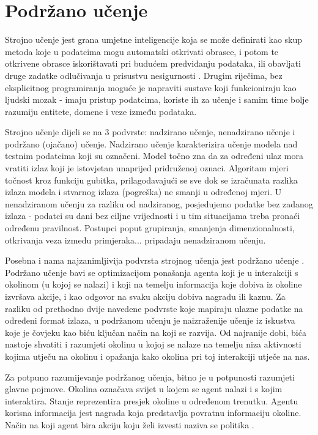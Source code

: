 \chapter{Podržano učenje}

Strojno učenje  jest grana umjetne inteligencije  koja se može definirati kao skup metoda koje u podatcima mogu automatski otkrivati obrasce, i potom te otkrivene obrasce iskorištavati pri budućem predviđanju podataka, ili obavljati druge zadatke odlučivanja u prisustvu nesigurnosti \cite{CupicUvod}. Drugim riječima, bez eksplicitnog programiranja moguće je napraviti sustave koji funkcioniraju kao ljudski mozak - imaju pristup podatcima, koriste ih za učenje i samim time bolje razumiju entitete, domene i veze između podataka. 

Strojno učenje dijeli se na 3 podvrste: nadzirano učenje, nenadzirano učenje i podržano (ojačano) učenje. Nadzirano učenje  karakterizira učenje modela nad testnim podatcima koji su označeni. Model točno zna da za određeni ulaz mora vratiti izlaz koji je istovjetan unaprijed pridruženoj oznaci. Algoritam mjeri točnost kroz funkciju gubitka, prilagođavajući se sve dok se izračunata razlika izlaza modela i stvarnog izlaza (pogreška) ne smanji u određenoj mjeri. U nenadziranom učenju  za razliku od nadziranog, posjedujemo podatke bez zadanog izlaza - podatci su dani bez ciljne vrijednosti i u tim situacijama treba pronaći određenu pravilnost. Postupci poput grupiranja, smanjenja dimenzionalnosti, otkrivanja veza između primjeraka... pripadaju nenadziranom učenju.

Posebna i nama najzanimljivija podvrsta strojnog učenja jest podržano učenje . Podržano učenje bavi se optimizacijom ponašanja agenta koji je u interakciji s okolinom (u kojoj se nalazi) i koji na temelju informacija koje dobiva iz okoline izvršava akcije, i kao odgovor na svaku akciju dobiva nagradu ili kaznu. Za razliku od prethodno dvije navedene podvrste koje mapiraju ulazne podatke na određeni format izlaza, u podržanom učenju je naizraženije učenje iz iskustva koje je čovjeku kao biću ključan način na koji se razvija. Od najranije dobi, bića nastoje shvatiti i razumjeti okolinu u kojoj se nalaze na temelju niza aktivnosti kojima utječu na okolinu i opažanja kako okolina pri toj interakciji utječe na nas. 

Za potpuno razumijevanje podržanog učenja, bitno je u potpunosti razumjeti glavne pojmove. Okolina  označava svijet u kojem se agent nalazi i s kojim interaktira. Stanje  reprezentira presjek okoline u određenom trenutku. Agentu korisna informacija jest nagrada  koja predstavlja povratnu informaciju okoline. Način na koji agent bira akciju  koju želi izvesti naziva se politika .

